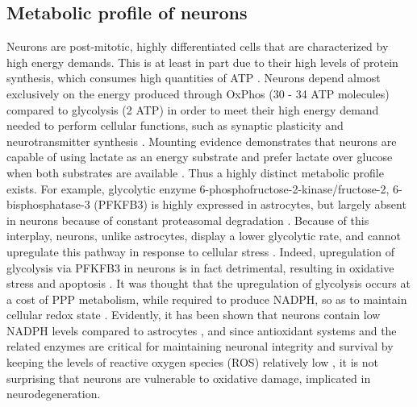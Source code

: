 \subsection{Metabolic profile of neurons}
Neurons are post-mitotic, highly differentiated cells that are characterized by high energy demands. This is at least in part due to their high levels of protein synthesis, which consumes high quantities of ATP \citep{Buttgereit1995}. Neurons depend almost exclusively on the energy produced through OxPhos (30 - 34 ATP molecules) compared to glycolysis (2 ATP) in order to meet their high energy demand needed to perform cellular functions, such as synaptic plasticity and neurotransmitter synthesis \citep{Cenini2019,Mattson2008,Schonfeld2013}. Mounting evidence demonstrates that neurons are capable of using lactate as an energy substrate \citep{Boumezbeur2010,Bouzier2000,Serres2005} and prefer lactate over glucose when both substrates are available \citep{Bouzier-Sore2006,Itoh2003}. Thus a highly distinct metabolic profile exists. For example, glycolytic enzyme 6-phosphofructose-2-kinase/fructose-2, 6-bisphosphatase-3 (PFKFB3) is highly expressed in astrocytes, but largely absent in neurons because of constant proteasomal degradation \citep{Almeida2004,Herrero-Mendez2009}. Because of this interplay, neurons, unlike astrocytes, display a lower glycolytic rate, and cannot upregulate this pathway in response to cellular stress \citep{Almeida2004,Herrero-Mendez2009}. Indeed, upregulation of glycolysis via PFKFB3 in neurons is in fact detrimental, resulting in oxidative stress and apoptosis \citep{Herrero-Mendez2009}. It was thought that the upregulation of glycolysis occurs at a cost of PPP metabolism, while  required to produce NADPH, so as to maintain cellular redox state \citep{Herrero-Mendez2009}. Evidently, it has been shown that neurons contain low NADPH levels compared to astrocytes \citep{Ben-Yoseph1996,Garcia-Nogales2003}, and since antioxidant systems and the related enzymes are critical for maintaining neuronal integrity and survival by keeping the levels of reactive oxygen species (ROS) relatively low \citep{Cenini2019}, it is not surprising that neurons are vulnerable to oxidative damage, implicated in neurodegeneration.

